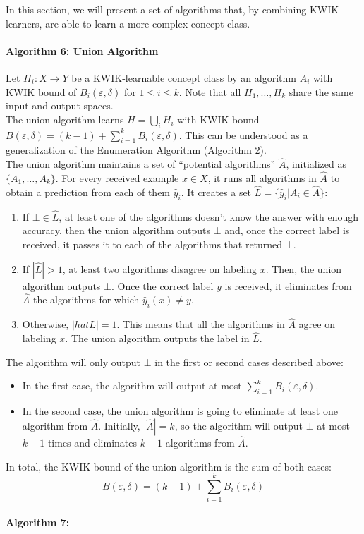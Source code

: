 In this section, we will present a set of algorithms that, by combining KWIK
learners, are able to learn a more complex concept class. \\

\paragraph{Algorithm 6: Union Algorithm}
Let $H_i: X \to Y$ be a KWIK-learnable concept class by an algorithm $A_i$
with KWIK bound of $B_i(\varepsilon, \delta)$ for $1 \leq i \leq k$. Note that
all $H_1, \ldots, H_k$ share the same input and output spaces. \\

The union algorithm learns $H = \bigcup_i H_i$ with KWIK bound $B(\varepsilon,
\delta) = (k - 1) + \sum_{i = 1}^k B_i(\varepsilon, \delta)$. This can be
understood as a generalization of the Enumeration Algorithm (Algorithm 2). \\

The union algorithm maintains a set of ``potential algorithms'' $\hat{A}$,
initialized as $\{ A_1, \ldots, A_k \}$. For every received example
$x \in X$, it runs all algorithms in $\hat{A}$ to obtain a prediction from each
of them $\hat{y}_i$. It creates a set $\hat{L} = \{ \hat{y}_i | A_i \in \hat{A} \}$:
\begin{enumerate}
  \item If $\bot \in \hat{L}$, at least one of the algorithms doesn't know the
  answer with enough accuracy, then the union algorithm outputs $\bot$ and, once
  the correct label is received, it passes it to each of the algorithms that
  returned $\bot$.
  \item If $|\hat{L}| > 1$, at least two algorithms disagree on labeling $x$.
  Then, the union algorithm outputs $\bot$. Once the correct label $y$ is
  received, it eliminates from $\hat{A}$ the algorithms for which $\hat{y}_i(x)
  \neq y$.
  \item Otherwise, $|hat{L}| = 1$. This means that all the algorithms in
  $\hat{A}$ agree on labeling $x$. The union algorithm outputs the label in
  $\hat{L}$.
\end{enumerate}

The algorithm will only output $\bot$ in the first or second cases described
above:
\begin{itemize}
  \item In the first case, the algorithm will output at most $\sum_{i = 1}^k
  B_i(\varepsilon, \delta)$.
  \item In the second case, the union algorithm is going to eliminate at least one
  algorithm from $\hat{A}$. Initially, $|\hat{A}| = k$, so the algorithm will
  output $\bot$ at most $k - 1$ times and eliminates $k - 1$ algorithms from
  $\hat{A}$.
\end{itemize}

In total, the KWIK bound of the union algorithm is the sum of both cases:
$$ B(\varepsilon, \delta) = (k - 1) + \sum_{i = 1}^k B_i(\varepsilon, \delta) $$


\paragraph{Algorithm 7: }
